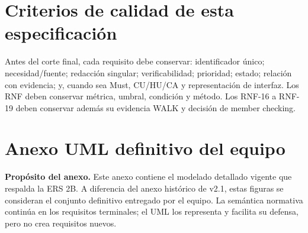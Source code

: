 \documentclass[11pt,a4paper,twoside]{article}
\begin{document}
\section{Criterios de calidad de esta especificación}
Antes del corte final, cada requisito debe conservar: identificador único; necesidad/fuente; redacción singular; verificabilidad; prioridad; estado; relación con evidencia; y, cuando sea Must, CU/HU/CA y representación de interfaz. Los RNF deben conservar métrica, umbral, condición y método. Los RNF-16 a RNF-19 deben conservar además su evidencia WALK y decisión de member checking.



\section{Anexo UML definitivo del equipo}
\begin{importantbox}
\textbf{Propósito del anexo.} Este anexo contiene el modelado detallado vigente que respalda la ERS 2B. A diferencia del anexo histórico de v2.1, estas figuras se consideran el conjunto definitivo entregado por el equipo. La semántica normativa continúa en los requisitos terminales; el UML los representa y facilita su defensa, pero no crea requisitos nuevos.
\end{importantbox}
\end{document}
